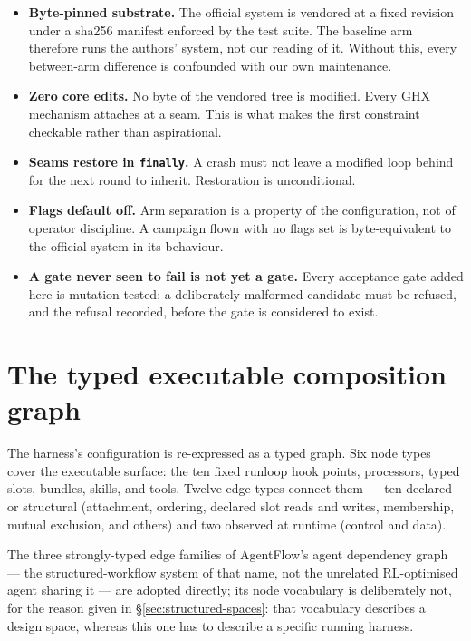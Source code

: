 \begin{itemize}
  \item \textbf{Byte-pinned substrate.} The official system is vendored at
        a fixed revision under a sha256 manifest enforced by the test
        suite. The baseline arm therefore runs the authors' system, not our
        reading of it. Without this, every between-arm difference is
        confounded with our own maintenance.
  \item \textbf{Zero core edits.} No byte of the vendored tree is modified.
        Every GHX mechanism attaches at a seam. This is what makes the
        first constraint checkable rather than aspirational.
  \item \textbf{Seams restore in \texttt{finally}.} A crash must not leave
        a modified loop behind for the next round to inherit. Restoration
        is unconditional.
  \item \textbf{Flags default off.} Arm separation is a property of the
        configuration, not of operator discipline. A campaign flown with
        no flags set is byte-equivalent to the official system in its
        behaviour.
  \item \textbf{A gate never seen to fail is not yet a gate.} Every
        acceptance gate added here is mutation-tested: a deliberately
        malformed candidate must be refused, and the refusal recorded,
        before the gate is considered to exist.
\end{itemize}

\section{The typed executable composition graph}
\label{sec:composition-graph}

The harness's configuration is re-expressed as a typed graph. Six node
types cover the executable surface: the ten fixed runloop hook points,
processors, typed slots, bundles, skills, and tools. Twelve edge types
connect them --- ten declared or structural (attachment, ordering, declared
slot reads and writes, membership, mutual exclusion, and others) and two
observed at runtime (control and data).

The three strongly-typed edge families of AgentFlow's agent dependency
graph~\cite{agentflow} --- the structured-workflow system of that name, not
the unrelated RL-optimised agent sharing it --- are adopted directly; its
node vocabulary is
deliberately not, for the reason given in \S\ref{sec:structured-spaces}:
that vocabulary describes a design space, whereas this one has to describe
a specific running harness.

